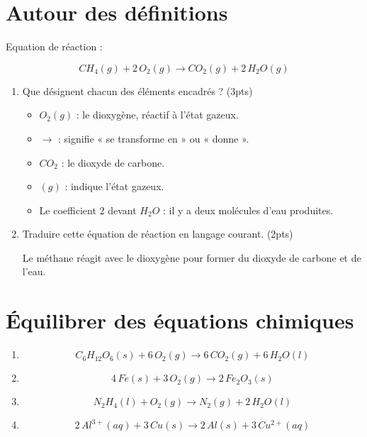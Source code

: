 \documentclass[a4paper,11pt,fleqn]{scrartcl}
\begin{document}
	\maketitle
	
	\section{Autour des définitions}
    
    Equation de réaction :
    
    \[
    CH_4(g) + 2\,O_2(g) \rightarrow CO_2(g) + 2\,H_2O(g)
    \]
    
    \begin{enumerate}
        \item Que désignent chacun des éléments encadrés ? (3pts)
        
        \begin{itemize}
            \item $O_2(g)$ : le dioxygène, réactif à l’état gazeux.
            \item $\rightarrow$ : signifie « se transforme en » ou « donne ».
            \item $CO_2$ : le dioxyde de carbone.
            \item $(g)$ : indique l’état gazeux.
            \item Le coefficient 2 devant $H_2O$ : il y a deux molécules d’eau produites.
        \end{itemize}

        \item Traduire cette équation de réaction en langage courant. (2pts)
        
        Le méthane réagit avec le dioxygène pour former du dioxyde de carbone et de l’eau.
        
    \end{enumerate}

    \section{Équilibrer des équations chimiques}

    \begin{enumerate}
        \item
        
        \[
        C_6H_{12}O_6(s) + 6\,O_2(g) \rightarrow 6\,CO_2(g) + 6\,H_2O(l)
        \]

        \item
        
        \[
        4\,Fe(s) + 3\,O_2(g) \rightarrow 2\,Fe_2O_3(s)
        \]

        \item
        
        \[
        N_2H_4(l) + O_2(g) \rightarrow N_2(g) + 2\,H_2O(l)
        \]

        \item
        
        \[
        2\,Al^{3+}(aq) + 3\,Cu(s) \rightarrow 2\,Al(s) + 3\,Cu^{2+}(aq)
        \]
        
    \end{enumerate}
\end{document}

